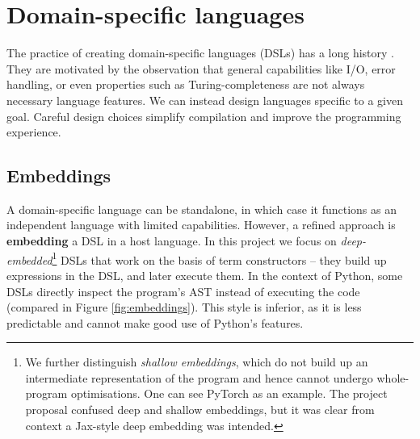 

\section{Domain-specific languages}
\label{domain-specific-languages}

The practice of creating domain-specific languages (DSLs) has a long history \cite{hudak1996building}. They are motivated by the observation that general capabilities like I/O, error handling, or even properties such as Turing-completeness are not always necessary language features. We can instead design languages specific to a given goal. Careful design choices simplify compilation and improve the programming experience.

\subsection{Embeddings}

A domain-specific language can be standalone, in which case it functions as an independent language with limited capabilities. 
However, a refined approach is \textbf{embedding} a DSL in a host language. 
In this project we focus on \textit{deep-embedded}\footnote{We further distinguish \textit{shallow embeddings}, which do not build up an intermediate representation of the program \cite{gibbons2014folding} and hence cannot undergo whole-program optimisations. One can see PyTorch as an example. The project proposal confused deep and shallow embeddings, but it was clear from context a Jax-style deep embedding was intended.} DSLs that work on the basis of term constructors -- they build up expressions in the DSL, and later execute them. 
In the context of Python, some DSLs directly inspect the program's AST instead of executing the code (compared in Figure \ref{fig:embeddings}). 
This style is inferior, as it is less predictable and cannot make good use of Python's features. 


